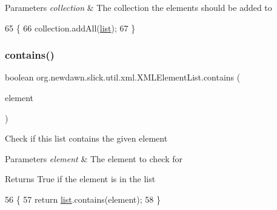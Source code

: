 \begin{DoxyParams}{Parameters}
{\em collection} & The collection the elements should be added to \\
\hline
\end{DoxyParams}

\begin{DoxyCode}
65                                                 \{
66         collection.addAll(\mbox{\hyperlink{classorg_1_1newdawn_1_1slick_1_1util_1_1xml_1_1_x_m_l_element_list_ade4a37ed92cf6392dbea3cdc9d9e6a6f}{list}});
67     \}
\end{DoxyCode}
\mbox{\label{classorg_1_1newdawn_1_1slick_1_1util_1_1xml_1_1_x_m_l_element_list_aa28c4ed57a6a25c239bed647d92cde21}} 
\subsubsection{\texorpdfstring{contains()}{contains()}}
{\footnotesize\ttfamily boolean org.\+newdawn.\+slick.\+util.\+xml.\+X\+M\+L\+Element\+List.\+contains (\begin{DoxyParamCaption}\item[{\mbox{\hyperlink{classorg_1_1newdawn_1_1slick_1_1util_1_1xml_1_1_x_m_l_element}{X\+M\+L\+Element}}}]{element }\end{DoxyParamCaption})\hspace{0.3cm}{\ttfamily [inline]}}

Check if this list contains the given element


\begin{DoxyParams}{Parameters}
{\em element} & The element to check for \\
\hline
\end{DoxyParams}
\begin{DoxyReturn}{Returns}
True if the element is in the list 
\end{DoxyReturn}

\begin{DoxyCode}
56                                                 \{
57         \textcolor{keywordflow}{return} \mbox{\hyperlink{classorg_1_1newdawn_1_1slick_1_1util_1_1xml_1_1_x_m_l_element_list_ade4a37ed92cf6392dbea3cdc9d9e6a6f}{list}}.contains(element);
58     \}
\end{DoxyCode}
\mbox{\label{classorg_1_1newdawn_1_1slick_1_1util_1_1xml_1_1_x_m_l_element_list_a4c9ae5e68abe89eed0203d2c4774b34b}} 
